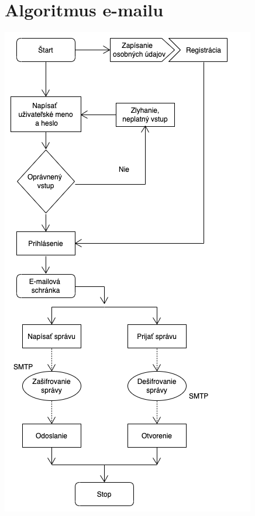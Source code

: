\documentclass[10pt,twoside,slovak,a4paper]{article}
\begin{document}
\section{Algoritmus e-mailu}
\begin{minipage}[tbh]{.49\textwidth}
\includegraphics[width=0.8\linewidth]{algoritmus.png}
\end{minipage}
\end{document}
